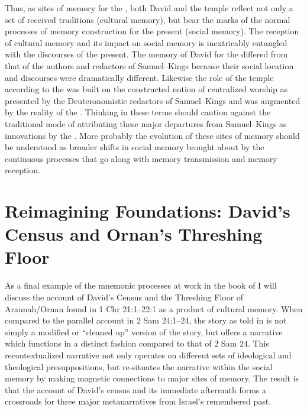 Thus, as sites of memory for the \chronicler, both David and the temple reflect not only a set of received traditions (cultural memory), but bear the marks of the normal processes of memory construction for the present (social memory). The reception of cultural memory and its impact on social memory is inextricably entangled with the discourses of the present. The memory of David for the \chronicler differed from that of the authors and redactors of Samuel--Kings because their social location and discourses were dramatically different. Likewise the role of the temple according to the \chronicler was built on the constructed notion of centralized worship as presented by the Deuteronomistic redactors of Samuel--Kings and was augmented by the reality of the \secondtemple. Thinking in these terms should caution against the traditional mode of attributing these major departures from Samuel--Kings as innovations by the \chronicler. More probably the evolution of these sites of memory should be understood as broader shifts in social memory brought about by the continuous processes that go along with memory transmission and memory reception. 

\section{Reimagining Foundations: David's Census and Ornan's Threshing Floor}

As a final example of the mnemonic processes at work in the book of \chronicles I will discuss the account of David's Census and the Threshing Floor of Araunah/Ornan found in 1 Chr 21:1--22:1 as a product of cultural memory. When compared to the parallel account in 2 Sam 24:1--24, the story as told in \chronicles is not simply a modified or ``cleaned up'' version of the story, but offers a narrative which functions in a distinct fashion compared to that of 2 Sam 24. This recontextualized narrative not only operates on different sets of ideological and theological presuppositions, but re-situates the narrative within the social memory by making magnetic connections to major sites of memory. The result is that the account of David's census and its immediate aftermath forms a crossroads for three major metanarratives from Israel's remembered past.

